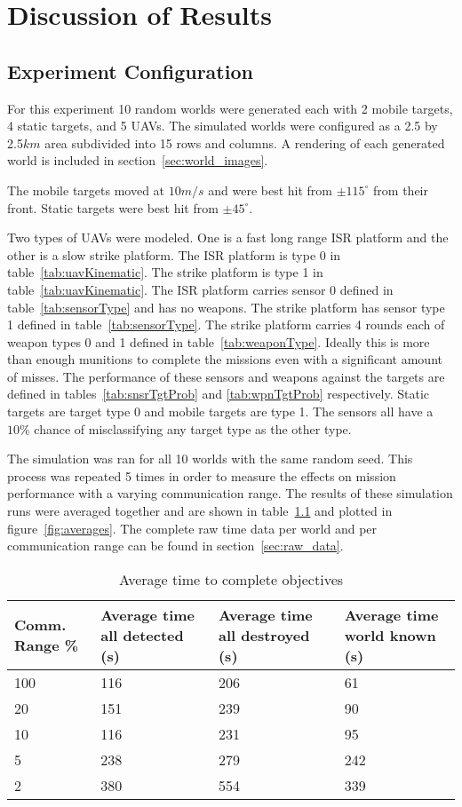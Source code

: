 \chapter{Discussion of Results}

\section{Experiment Configuration}
For this experiment 10 random worlds were generated each with 2 mobile targets, 4 static targets, and 5 UAVs.  The simulated worlds were configured as a 2.5 by 2.5$km$ area subdivided into 15 rows and columns.  A rendering of each generated world is included in section~\ref{sec:world_images}.

The mobile targets moved at $10m/s$ and were best hit from $\pm115^{\circ}$ from their front.  Static targets were best hit from $\pm45^{\circ}$.

Two types of UAVs were modeled.  One is a fast long range ISR platform and the other is a slow strike platform.  The ISR platform is type 0 in table~\ref{tab:uavKinematic}.  The strike platform is type 1 in table~\ref{tab:uavKinematic}.  The ISR platform carries sensor 0 defined in table~\ref{tab:sensorType} and has no weapons.  The strike platform has sensor type 1 defined in table~\ref{tab:sensorType}.  The strike platform carries 4 rounds each of weapon types 0 and 1 defined in table~\ref{tab:weaponType}.  Ideally this is more than enough munitions to complete the missions even with a significant amount of misses.  The performance of these sensors and weapons against the targets are defined in tables~\ref{tab:snsrTgtProb} and \ref{tab:wpnTgtProb} respectively.  Static targets are target type 0 and mobile targets are type 1.  The sensors all have a $10\%$ chance of misclassifying any target type as the other type.

The simulation was ran for all 10 worlds with the same random seed.  This process was repeated 5 times in order to measure the effects on mission performance with a varying communication range.  The results of these simulation runs were averaged together and are shown in table~\ref{tab:avgResults} and plotted in figure~\ref{fig:averages}.  The complete raw time data per world and per communication range can be found in section~\ref{sec:raw_data}.

\begin{table}[H]
	\caption{Average time to complete objectives}
	\centering
	\label{tab:avgResults}
	\begin{tabular}{|p{1.25cm}|p{1.5cm}|p{1.75cm}|p{1.5cm}|}
		\hline
		Comm. Range \% & Average time all detected (s) & Average time all destroyed (s) & Average time world known (s)\\
		\hline
		100 & 116 & 206 & 61  \\ \hline
		20  & 151 & 239 & 90  \\ \hline
		10  & 116 & 231 & 95  \\ \hline
		5   & 238 & 279 & 242 \\ \hline
		2   & 380 & 554 & 339 \\ \hline
	\end{tabular}
\end{table}

